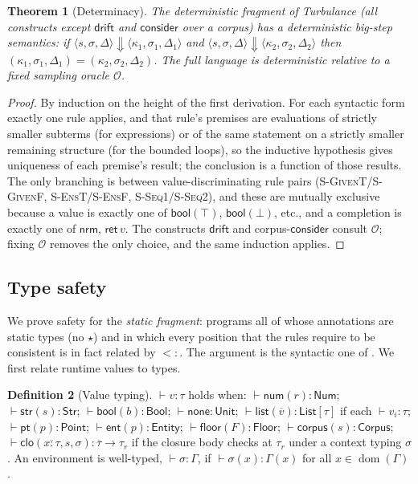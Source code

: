 \documentclass[11pt,a4paper]{article}
\theoremstyle{plain}
\newtheorem{theorem}{Theorem}[section]
\theoremstyle{definition}
\newtheorem{definition}[theorem]{Definition}
\theoremstyle{remark}
\newcommand{\rn}[1]{\textsc{#1}}                          %
\DeclareMathOperator{\dom}{dom}                           %
\newcommand{\evalto}{\Downarrow}
\newcommand{\env}{\sigma}
\newcommand{\dyn}{\star}                                  %
\newcommand{\subtype}{<:}
\newcommand{\Gam}{\Gamma}
\newcommand{\nrm}{\mathsf{nrm}}
\newcommand{\ret}{\mathsf{ret}}
\begin{document}
\begin{theorem}[Determinacy]
\label{thm:determinacy}
The deterministic fragment of Turbulance (all constructs except $\mathsf{drift}$
and $\mathsf{consider}$ over a corpus) has a deterministic big-step semantics:
if $\langle s,\env,\Delta\rangle\evalto\langle\kappa_1,\env_1,\Delta_1\rangle$
and $\langle s,\env,\Delta\rangle\evalto\langle\kappa_2,\env_2,\Delta_2\rangle$
then $(\kappa_1,\env_1,\Delta_1)=(\kappa_2,\env_2,\Delta_2)$. The full language
is deterministic relative to a fixed sampling oracle $\mathcal{O}$.
\end{theorem}
\begin{proof}
By induction on the height of the first derivation. For each syntactic form
exactly one rule applies, and that rule's premises are evaluations of
strictly smaller subterms (for expressions) or of the same statement on a
strictly smaller remaining structure (for the bounded loops), so the inductive
hypothesis gives uniqueness of each premise's result; the conclusion is a
function of those results. The only branching is between value-discriminating
rule pairs (\rn{S-GivenT}/\rn{S-GivenF}, \rn{S-EnsT}/\rn{S-EnsF},
\rn{S-Seq1}/\rn{S-Seq2}), and these are mutually exclusive because a value is
exactly one of $\mathsf{bool}(\top)$, $\mathsf{bool}(\bot)$, etc., and a
completion is exactly one of $\nrm$, $\ret\,v$. The constructs $\mathsf{drift}$
and corpus-$\mathsf{consider}$ consult $\mathcal{O}$; fixing $\mathcal{O}$
removes the only choice, and the same induction applies.
\end{proof}

\subsection{Type safety}

We prove safety for the \emph{static fragment}: programs all of whose
annotations are static types (no $\dyn$) and in which every position that the
rules require to be consistent is in fact related by $\subtype$. The argument is
the syntactic one of \citet{wright1994,pierce2002}. We first relate runtime
values to types.

\begin{definition}[Value typing]
$\vdash v:\tau$ holds when: $\vdash\mathsf{num}(r):\mathsf{Num}$;
$\vdash\mathsf{str}(s):\mathsf{Str}$; $\vdash\mathsf{bool}(b):\mathsf{Bool}$;
$\vdash\mathsf{none}:\mathsf{Unit}$; $\vdash\mathsf{list}(\overline v):
\mathsf{List}[\tau]$ if each $\vdash v_i:\tau$; $\vdash\mathsf{pt}(p):
\mathsf{Point}$; $\vdash\mathsf{ent}(p):\mathsf{Entity}$;
$\vdash\mathsf{floor}(F):\mathsf{Floor}$; $\vdash\mathsf{corpus}(s):
\mathsf{Corpus}$; $\vdash\mathsf{clo}(\overline{x{:}\tau},s,\env):
\overline\tau\to\tau_r$ if the closure body checks at $\tau_r$ under a context
typing $\env$. An environment is well-typed, $\vdash\env:\Gam$, if
$\vdash\env(x):\Gam(x)$ for all $x\in\dom(\Gam)$.
\end{definition}
\end{document}
